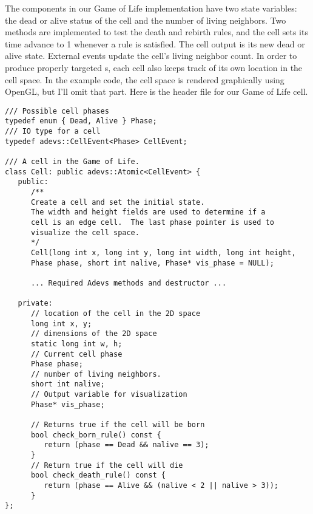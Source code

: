 The  components in our Game of Life implementation have two state variables: the dead or alive status of the cell and the number of living neighbors. Two methods are implemented to test the death and rebirth rules, and the cell sets its time advance to 1 whenever a rule is satisfied. The cell output is its new dead or alive state. External events update the cell's living neighbor count. In order to produce properly targeted s, each cell also keeps track of its own location in the cell space. In the example code, the cell space is rendered graphically using OpenGL, but I'll omit that part. Here is the header file for our Game of Life cell.
\begin{verbatim}
/// Possible cell phases
typedef enum { Dead, Alive } Phase;
/// IO type for a cell
typedef adevs::CellEvent<Phase> CellEvent;

/// A cell in the Game of Life.  
class Cell: public adevs::Atomic<CellEvent> {
   public:
      /**
      Create a cell and set the initial state.
      The width and height fields are used to determine if a
      cell is an edge cell.  The last phase pointer is used to
      visualize the cell space.
      */
      Cell(long int x, long int y, long int width, long int height, 
      Phase phase, short int nalive, Phase* vis_phase = NULL);

      ... Required Adevs methods and destructor ...

   private:   
      // location of the cell in the 2D space
      long int x, y;
      // dimensions of the 2D space
      static long int w, h;
      // Current cell phase
      Phase phase;
      // number of living neighbors.
      short int nalive;
      // Output variable for visualization
      Phase* vis_phase;

      // Returns true if the cell will be born
      bool check_born_rule() const {
         return (phase == Dead && nalive == 3);
      }
      // Return true if the cell will die
      bool check_death_rule() const {
         return (phase == Alive && (nalive < 2 || nalive > 3));
      }
};
\end{verbatim}

